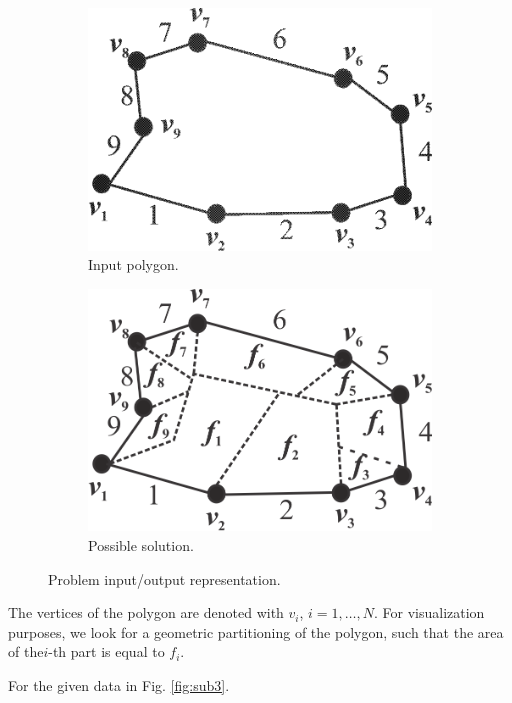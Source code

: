 \documentclass[11pt,leqno]{book}
\begin{document}
\begin{figure}
\centering
\begin{subfigure}{.5\textwidth}
  \centering
  \includegraphics[width=.5\linewidth]{pic01.png}
  \caption{Input polygon.}
  \label{fig:sub1}
\end{subfigure}%
\begin{subfigure}{.5\textwidth}
  \centering
  \includegraphics[width=.5\linewidth]{pic03.png}
  \caption{Possible solution.}
  \label{fig:sub2}
\end{subfigure}
\caption{Problem input/output representation.}
\label{fig:one}
\end{figure}

The vertices of the polygon are denoted with $v_i$, $ i = 1, \ldots, N$.
For visualization purposes, we look for a geometric partitioning of the polygon, such that the area of the$i$-th part is equal to $f_i$.

For the given data in Fig. \ref{fig:sub3}.
\end{document}
